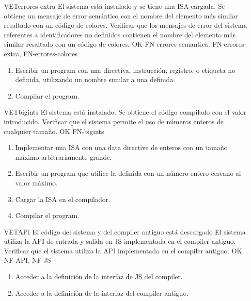 \begin{testCase}{VET}{errores-extra}
    {El sistema está instalado y se tiene una \gls{ISA} cargada.} %
    {Se obtiene un mensaje de error semántico con el nombre del elemento más similar resaltado con un código de colores.} %
    {Verificar que los mensajes de error del sistema referentes a
    identificadores no definidos contienen el nombre del elemento más similar resaltado con un código de colores.} %
    {OK} %
    {FN-errores-semantica, FN-errores-extra, FN-errores-colores} %
    \begin{enumerate}[leftmargin=*, topsep=0pt, noitemsep] %
        \item Escribir un \gls{program} con una directiva, instrucción,
        registro, o etiqueta no definida, utilizando un nombre similar a una
        definida.
        \item Compilar el \gls{program}.
    \end{enumerate}
\end{testCase}

\begin{testCase}{VET}{bigints}
    {El sistema está instalado.} %
    {Se obtiene el código compilado con el valor introducido.} %
    {Verificar que el sistema permite el uso de números enteros de cualquier tamaño.} %
    {OK} %
    {FN-bigints} %
    \begin{enumerate}[leftmargin=*, topsep=0pt, noitemsep] %
        \item Implementar una \gls{ISA} con una \gls{data directive} de
        enteros con un tamaño máximo arbitrariamente grande.
        \item Escribir un \gls{program} que utilice la  definida con un número entero cercano al valor
        máximo.
        \item Cargar la \gls{ISA} en el compilador.
        \item Compilar el \gls{program}.
    \end{enumerate}
\end{testCase}

\begin{testCase}{VET}{API}
    {El código del sistema y del \gls{compiler} antiguo está descargado} %
    {El sistema utiliza la \gls{API} de entrada y salida en \gls{JS}
    implementada en el \gls{compiler} antiguo.} %
    {Verificar que el sistema utiliza la \gls{API} implementada en el \gls{compiler} antiguo.} %
    {OK} %
    {NF-API, NF-JS} %
    \begin{enumerate}[leftmargin=*, topsep=0pt, noitemsep] %
        \item Acceder a la definición de la interfaz de \gls{JS} del \gls{compiler}.
        \item Acceder a la definición de la interfaz del \gls{compiler} antiguo.
    \end{enumerate}
\end{testCase}

